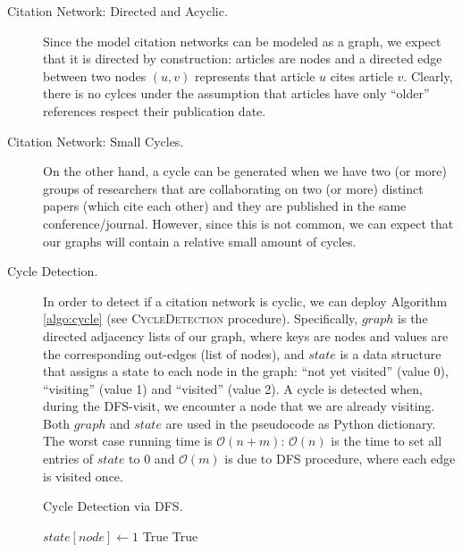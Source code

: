 \documentclass[12pt,a4paper]{article}
\begin{document}
\begin{description}

\item[Citation Network: Directed and Acyclic.] Since the model citation networks can be modeled as a graph, we expect that it is directed by construction: articles are nodes and a directed edge between two nodes $(u, v)$ represents that article $u$ cites article $v$. Clearly, there is no cylces under the assumption that articles have only ``older'' references respect their publication date.

\item[Citation Network: Small Cycles.] On the other hand, a cycle can be generated when we have two (or more) groups of researchers that are collaborating on two (or more) distinct papers (which cite each other) and they are published in the same conference/journal. However, since this is not common, we can expect that our graphs will contain a relative small amount of cycles.

\item[Cycle Detection.] In order to detect if a citation network is cyclic, we can deploy Algorithm \ref{algo:cycle} (see \textsc{CycleDetection} procedure). Specifically, $graph$ is the directed adjacency lists of our graph, where keys are nodes and values are the corresponding out-edges (list of nodes), and $state$ is a data structure that assigns a state to each node in the graph: ``not yet visited'' (value 0), ``visiting'' (value 1) and ``visited'' (value 2). A cycle is detected when, during the DFS-visit, we encounter a node that we are already visiting. Both $graph$ and $state$ are used in the pseudocode as Python dictionary. The worst case running time is $\mathcal{O}(n + m)$: $\mathcal{O}(n)$ is the time to set all entries of $state$ to 0 and $\mathcal{O}(m)$ is due to DFS procedure, where each edge is visited once.



\begin{algorithm}
\caption{Cycle Detection via DFS.}\label{algo:cycle}
\begin{algorithmic}[1]
\State $state[node] \gets 1$
    	\State \Return True
        	\State \Return True
\end{algorithmic}
\end{algorithm}


\end{description}
\end{document}
